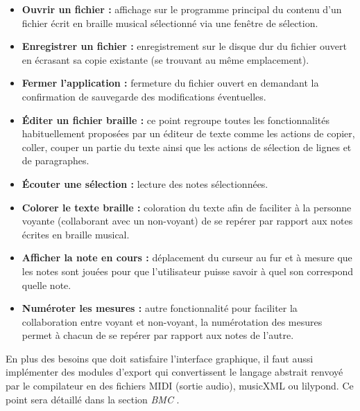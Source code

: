 \begin{itemize}
  \item \textbf{Ouvrir un fichier :} affichage sur le programme principal du contenu d'un fichier écrit en braille musical sélectionné via une fenêtre de sélection.\\
  \item \textbf{Enregistrer un fichier :} enregistrement sur le disque dur du fichier ouvert en écrasant sa copie existante (se trouvant au même emplacement).\\
  \item \textbf{Fermer l'application :} fermeture du fichier ouvert en demandant la confirmation de sauvegarde des modifications éventuelles.\\
  \item \textbf{Éditer un fichier braille :} ce point regroupe toutes les fonctionnalités habituellement proposées par un éditeur de texte comme les actions de copier, coller, couper un partie du texte ainsi que les actions de sélection de lignes et de paragraphes.\\

  \item \textbf{Écouter une sélection :} lecture des notes sélectionnées.\\
  \item \textbf{Colorer le texte braille :} coloration du texte afin de faciliter à la personne voyante (collaborant avec un non-voyant) de se repérer par rapport aux notes écrites en braille musical.\\
  \item \textbf{Afficher la note en cours :} déplacement du curseur au fur et à mesure que les notes sont jouées pour que l'utilisateur puisse savoir à quel son correspond quelle note.\\
  \item \textbf{Numéroter les mesures :} autre fonctionnalité pour faciliter la collaboration entre voyant et non-voyant, la numérotation des mesures permet à chacun de se repérer par rapport aux notes de l'autre.\\
\end{itemize}

En plus des besoins que doit satisfaire l'interface graphique, il faut aussi implémenter des modules d'export qui convertissent le langage abstrait renvoyé par le compilateur en des fichiers MIDI (sortie audio), musicXML ou lilypond. Ce point sera détaillé dans la section \textit{BMC}  .

